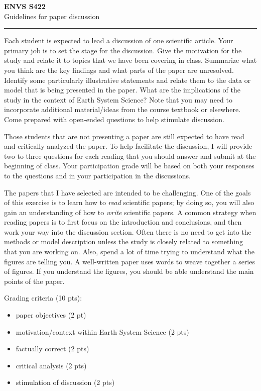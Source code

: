 \documentclass[11pt,letterpaper]{article}
\newcommand{\squeezeup}{\vspace{-2.5mm}}
\begin{document}
\setlength{\parindent}{0in}
\newcommand{\tablespace}[0]{\vspace{8pt}}
\textbf{ENVS S422}\\
Guidelines for paper discussion\\

\hrule
Each student is expected to lead a discussion of one scientific article. Your primary job is to set the stage for the discussion. Give the motivation for the study and relate it to topics that we have been covering in class. Summarize what you think are the key findings and what parts of the paper are unresolved. Identify some particularly illustrative statements and relate them to the data or model that is being presented in the paper. What are the implications of the study in the context of Earth System Science? Note that you may need to incorporate additional material/ideas from the course textbook or elsewhere. Come prepared with open-ended questions to help stimulate discussion.

Those students that are not presenting a paper are still expected to have read and critically analyzed the paper. To help facilitate the discussion, I will provide two to three questions for each reading that you should answer and submit at the beginning of class. Your participation grade will be based on both your responses to the questions and in your participation in the discussions.

The papers that I have selected are intended to be challenging. One of the goals of this exercise is to learn how to \textit{read} scientific papers; by doing so, you will also gain an understanding of how to \textit{write} scientific papers. A common strategy when reading papers is to first focus on the introduction and conclusions, and then work your way into the discussion section. Often there is no need to get into the methods or model description unless the study is closely related to something that you are working on. Also, spend a lot of time trying to understand what the figures are telling you. A well-written paper uses words to weave together a series of figures. If you understand the figures, you should be able understand the main points of the paper.

\hrulefill

Grading criteria (10 pts):

\begin{itemize}\itemsep -5pt \squeezeup
\item paper objectives (2 pt)
\item motivation/context within Earth System Science (2 pts)
\item factually correct (2 pts)
\item critical analysis (2 pts)
\item stimulation of discussion (2 pts)
\end{itemize} 
\end{document}

